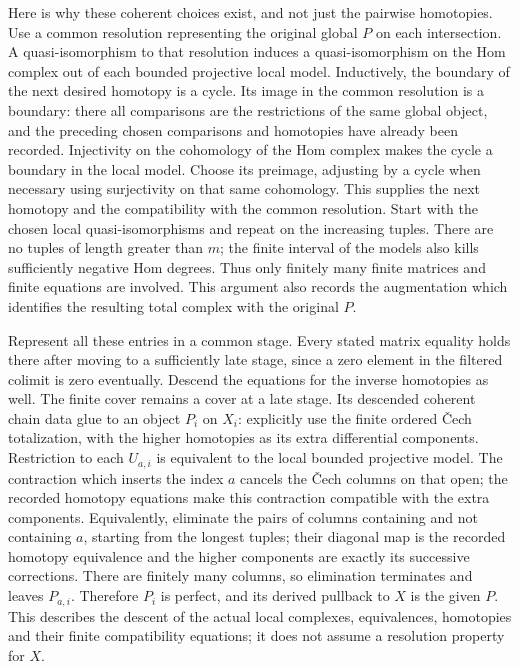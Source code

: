 \documentclass[11pt]{article}
\begin{document}
Here is why these coherent choices exist, and not just the pairwise
homotopies. Use a common resolution representing the original global
\(P\) on each intersection. A quasi-isomorphism to that resolution
induces a quasi-isomorphism on the Hom complex out of each bounded
projective local model. Inductively, the boundary of the next desired
homotopy is a cycle. Its image in the common resolution is a boundary:
there all comparisons are the restrictions of the same global object,
and the preceding chosen comparisons and homotopies have already been
recorded. Injectivity on the cohomology of the Hom complex makes the
cycle a boundary in the local model. Choose its preimage, adjusting by a
cycle when necessary using surjectivity on that same cohomology. This
supplies the next homotopy and the compatibility with the common
resolution. Start with the chosen local quasi-isomorphisms and repeat on
the increasing tuples. There are no tuples of length greater than \(m\);
the finite interval of the models also kills sufficiently negative Hom
degrees. Thus only finitely many finite matrices and finite equations
are involved. This argument also records the augmentation which
identifies the resulting total complex with the original \(P\).

Represent all these entries in a common stage. Every stated matrix
equality holds there after moving to a sufficiently late stage, since a
zero element in the filtered colimit is zero eventually. Descend the
equations for the inverse homotopies as well. The finite cover remains a
cover at a late stage. Its descended coherent chain data glue to an
object \(P_i\) on \(X_i\): explicitly use the finite ordered Čech
totalization, with the higher homotopies as its extra differential
components. Restriction to each \(U_{a,i}\) is equivalent to the local
bounded projective model. The contraction which inserts the index \(a\)
cancels the Čech columns on that open; the recorded homotopy equations
make this contraction compatible with the extra components.
Equivalently, eliminate the pairs of columns containing and not
containing \(a\), starting from the longest tuples; their diagonal map
is the recorded homotopy equivalence and the higher components are
exactly its successive corrections. There are finitely many columns, so
elimination terminates and leaves \(P_{a,i}\). Therefore \(P_i\) is
perfect, and its derived pullback to \(X\) is the given \(P\). This
describes the descent of the actual local complexes, equivalences,
homotopies and their finite compatibility equations; it does not assume
a resolution property for \(X\).
\end{document}
